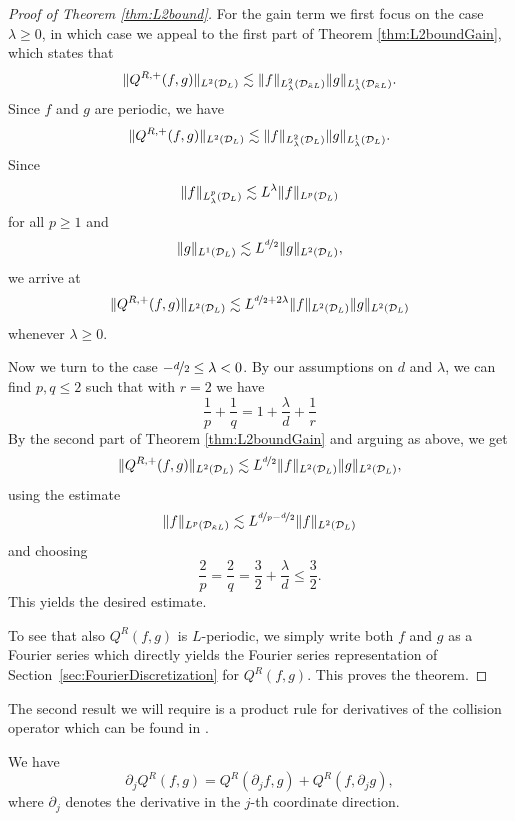 \begin{proof}[Proof of Theorem \ref{thm:L2bound}]
    For the gain term we first focus on the case $\lambda \geq 0$, in which
    case we appeal to the first part of Theorem \ref{thm:L2boundGain}, which
    states that
    \begin{equation}\label{eq:l2rest0}
        \|Q^{R,+}(f,g)\|_{{L^2(\mathcal{D}_L)}} \lesssim
                \|f\|_{L^2_\lambda(\mathcal{D}_{\tilde{\kappa}L})}\|g\|_{L^1_\lambda(\mathcal{D}_{\tilde{\kappa}L})}.
    \end{equation}
    Since $f$ and $g$ are periodic, we have
    \begin{equation}\label{eq:l2rest1}
        \|Q^{R,+}(f,g)\|_{{L^2(\mathcal{D}_L)}} \lesssim
                \|f\|_{L^2_\lambda(\mathcal{D}_L)}\|g\|_{L^1_\lambda(\mathcal{D}_L)}.
    \end{equation}
    Since 
    \[
        \|f\|_{L^p_\lambda(\mathcal{D}_L)}\lesssim L^\lambda\|f\|_{L^p(\mathcal{D}_L)}
    \]
    for all $p\geq 1$ and 
    \[
        \|g\|_{L^1(\mathcal{D}_L)}\lesssim L^{\nicefrac{d}{2}} \|g\|_{L^2(\mathcal{D}_L)},
    \]
    we arrive at
    \[
        \|Q^{R,+}(f,g)\|_{L^2(\mathcal{D}_L)} \lesssim L^{\nicefrac{d}{2}+2\lambda}
                \|f\|_{L^2(\mathcal{D}_L)}\|g\|_{L^2(\mathcal{D}_L)}
    \]
    whenever $\lambda \geq 0$.
    
    Now we turn to the case $-\nicefrac{d}{2} \le \lambda <0$.  By our assumptions on $d$
    and $\lambda$, we can find $p,q \le 2$ such that with $r=2$ we have
    \[
        \frac{1}{p} + \frac{1}{q} = 1 + \frac{\lambda}{d}+\frac{1}{r}
    \]
    By the second part of Theorem \ref{thm:L2boundGain} and arguing as above,
    we get
    \[
        \|Q^{R,+}(f,g)\|_{L^2(\mathcal{D}_L)} \lesssim L^{\nicefrac{d}{2}}
                \|f\|_{L^2(\mathcal{D}_L)}\|g\|_{L^2(\mathcal{D}_L)},
    \]
    using the estimate
    \[
        \|f\|_{L^p(\mathcal{D}_{\tilde{\kappa}L})} \lesssim L^{\nicefrac{d}{p}-\nicefrac{d}{2}} 
                \|f\|_{L^2(\mathcal{D}_L)}
    \]
    and choosing
    \[
        \frac{2}{p}=\frac{2}{q}=\frac{3}{2}+\frac{\lambda}{d} \le \frac{3}{2}.
    \]
    This yields the desired estimate.
    
    To see that also $Q^R(f,g)$ is $L$-periodic, we simply write both $f$ and
    $g$ as a Fourier series which directly yields the Fourier series
    representation of Section~\ref{sec:FourierDiscretization} for $Q^R(f,g)$.
    This proves the theorem.
\end{proof}
The second result we will require is a product rule for derivatives
of the collision operator which can be found in \cite{Villani98}.
\begin{proposition}\label{prop:prodrule}
    We have 
    \[
        \partial_j Q^R(f,g) = Q^R(\partial_j f, g) + Q^R(f,\partial_j g),
    \]
    where $\partial_j$ denotes the derivative in the $j$-th coordinate
    direction.
\end{proposition}
